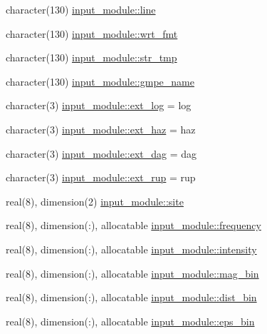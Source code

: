 \begin{DoxyCompactItemize}
\item 
character(130) \hyperlink{namespaceinput__module_a304ebe11a9b47adcaeb6db5be6bae12d}{input\+\_\+module\+::line}
\item 
character(130) \hyperlink{namespaceinput__module_ae257590e746cae45e031d04017cf76d1}{input\+\_\+module\+::wrt\+\_\+fmt}
\item 
character(130) \hyperlink{namespaceinput__module_aa2d7dcffb5650145aa835a858a0ad35a}{input\+\_\+module\+::str\+\_\+tmp}
\item 
character(130) \hyperlink{namespaceinput__module_ae241dcd6d1b9e390d39acb1f7ed2f38b}{input\+\_\+module\+::gmpe\+\_\+name}
\item 
character(3) \hyperlink{namespaceinput__module_a781c43885db3614608686197e48ab56b}{input\+\_\+module\+::ext\+\_\+log} = \textquotesingle{}log\textquotesingle{}
\item 
character(3) \hyperlink{namespaceinput__module_a860f66b4ca95c52a45651e1a7033e302}{input\+\_\+module\+::ext\+\_\+haz} = \textquotesingle{}haz\textquotesingle{}
\item 
character(3) \hyperlink{namespaceinput__module_ab8a4b6a5af6ac707c4c8656e4d709bec}{input\+\_\+module\+::ext\+\_\+dag} = \textquotesingle{}dag\textquotesingle{}
\item 
character(3) \hyperlink{namespaceinput__module_a5ba0c6f56b537efe7105ffc5ef3a9a98}{input\+\_\+module\+::ext\+\_\+rup} = \textquotesingle{}rup\textquotesingle{}
\item 
real(8), dimension(2) \hyperlink{namespaceinput__module_ab574bddc682ceabd1271512c2b1f4e20}{input\+\_\+module\+::site}
\item 
real(8), dimension(\+:), allocatable \hyperlink{namespaceinput__module_a2eec881a49e9f9d341e49f123b8435a3}{input\+\_\+module\+::frequency}
\item 
real(8), dimension(\+:), allocatable \hyperlink{namespaceinput__module_ab8a5b4989aa8a656c28df7fa39f21d03}{input\+\_\+module\+::intensity}
\item 
real(8), dimension(\+:), allocatable \hyperlink{namespaceinput__module_a1bbdfb734d8c5f5b6370d1ab7fbfb04a}{input\+\_\+module\+::mag\+\_\+bin}
\item 
real(8), dimension(\+:), allocatable \hyperlink{namespaceinput__module_a760ea371c13a02c658f3ec689a63adad}{input\+\_\+module\+::dist\+\_\+bin}
\item 
real(8), dimension(\+:), allocatable \hyperlink{namespaceinput__module_a6900d0ebf1a2f906895db37f5b82e495}{input\+\_\+module\+::eps\+\_\+bin}
\item 

\end{DoxyCompactItemize}
